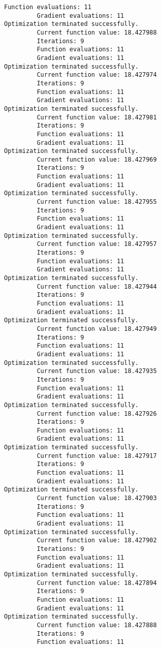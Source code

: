 \documentclass[11pt]{article}
\begin{document}
\begin{Verbatim}[commandchars=\\\{\}]
         Function evaluations: 11
         Gradient evaluations: 11
Optimization terminated successfully.
         Current function value: 18.427988
         Iterations: 9
         Function evaluations: 11
         Gradient evaluations: 11
Optimization terminated successfully.
         Current function value: 18.427974
         Iterations: 9
         Function evaluations: 11
         Gradient evaluations: 11
Optimization terminated successfully.
         Current function value: 18.427981
         Iterations: 9
         Function evaluations: 11
         Gradient evaluations: 11
Optimization terminated successfully.
         Current function value: 18.427969
         Iterations: 9
         Function evaluations: 11
         Gradient evaluations: 11
Optimization terminated successfully.
         Current function value: 18.427955
         Iterations: 9
         Function evaluations: 11
         Gradient evaluations: 11
Optimization terminated successfully.
         Current function value: 18.427957
         Iterations: 9
         Function evaluations: 11
         Gradient evaluations: 11
Optimization terminated successfully.
         Current function value: 18.427944
         Iterations: 9
         Function evaluations: 11
         Gradient evaluations: 11
Optimization terminated successfully.
         Current function value: 18.427949
         Iterations: 9
         Function evaluations: 11
         Gradient evaluations: 11
Optimization terminated successfully.
         Current function value: 18.427935
         Iterations: 9
         Function evaluations: 11
         Gradient evaluations: 11
Optimization terminated successfully.
         Current function value: 18.427926
         Iterations: 9
         Function evaluations: 11
         Gradient evaluations: 11
Optimization terminated successfully.
         Current function value: 18.427917
         Iterations: 9
         Function evaluations: 11
         Gradient evaluations: 11
Optimization terminated successfully.
         Current function value: 18.427903
         Iterations: 9
         Function evaluations: 11
         Gradient evaluations: 11
Optimization terminated successfully.
         Current function value: 18.427902
         Iterations: 9
         Function evaluations: 11
         Gradient evaluations: 11
Optimization terminated successfully.
         Current function value: 18.427894
         Iterations: 9
         Function evaluations: 11
         Gradient evaluations: 11
Optimization terminated successfully.
         Current function value: 18.427888
         Iterations: 9
         Function evaluations: 11

\end{Verbatim}
\end{document}
